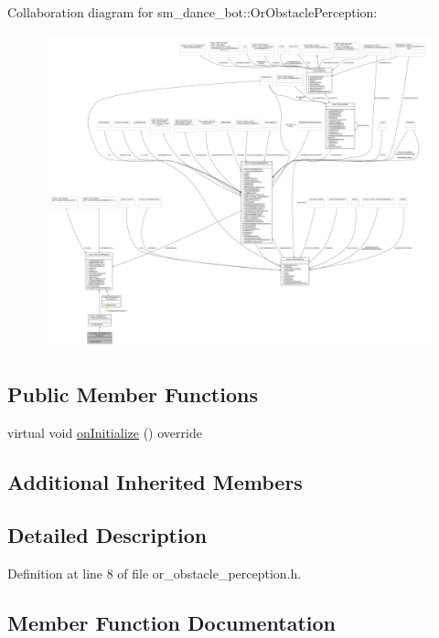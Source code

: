 Collaboration diagram for sm\+\_\+dance\+\_\+bot\+:\+:Or\+Obstacle\+Perception\+:
\nopagebreak
\begin{figure}[H]
\begin{center}
\leavevmode
\includegraphics[width=350pt]{classsm__dance__bot_1_1OrObstaclePerception__coll__graph}
\end{center}
\end{figure}
\subsection*{Public Member Functions}
\begin{DoxyCompactItemize}
\item 
virtual void \hyperlink{classsm__dance__bot_1_1OrObstaclePerception_a4597fbab143e9bc3e350dfa730242a08}{on\+Initialize} () override
\end{DoxyCompactItemize}
\subsection*{Additional Inherited Members}


\subsection{Detailed Description}


Definition at line 8 of file or\+\_\+obstacle\+\_\+perception.\+h.



\subsection{Member Function Documentation}
\mbox{\label{classsm__dance__bot_1_1OrObstaclePerception_a4597fbab143e9bc3e350dfa730242a08}} 
